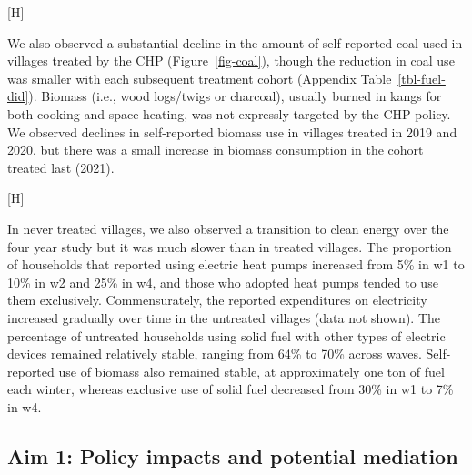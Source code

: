 \documentclass[
  letterpaper,
  DIV=11,
  numbers=noendperiod]{scrartcl}
\makeatletter
\renewenvironment{figure}%
   {\renewcommand\familydefault\sfdefault
    \@float{figure}}
   {\end@float}
\makeatother
\begin{document}
\begin{figure}[H]


\caption{\label{fig-sankey}Transitions to different energy sources
across study waves}

\end{figure}%

We also observed a substantial decline in the amount of self-reported
coal used in villages treated by the CHP (Figure~\ref{fig-coal}), though
the reduction in coal use was smaller with each subsequent treatment
cohort (Appendix Table~\ref{tbl-fuel-did}). Biomass (i.e., wood
logs/twigs or charcoal), usually burned in kangs for both cooking and
space heating, was not expressly targeted by the CHP policy. We observed
declines in self-reported biomass use in villages treated in 2019 and
2020, but there was a small increase in biomass consumption in the
cohort treated last (2021).

\begin{figure}[H]


\caption{\label{fig-coal}Trends in self-reported coal and biomass, by
treatment season.}

\end{figure}%

In never treated villages, we also observed a transition to clean energy
over the four year study but it was much slower than in treated
villages. The proportion of households that reported using electric heat
pumps increased from 5\% in w1 to 10\% in w2 and 25\% in w4, and those
who adopted heat pumps tended to use them exclusively. Commensurately,
the reported expenditures on electricity increased gradually over time
in the untreated villages (data not shown). The percentage of untreated
households using solid fuel with other types of electric devices
remained relatively stable, ranging from 64\% to 70\% across waves.
Self-reported use of biomass also remained stable, at approximately one
ton of fuel each winter, whereas exclusive use of solid fuel decreased
from 30\% in w1 to 7\% in w4.

\subsection{Aim 1: Policy impacts and potential
mediation}\label{aim-1-policy-impacts-and-potential-mediation}
\end{document}
